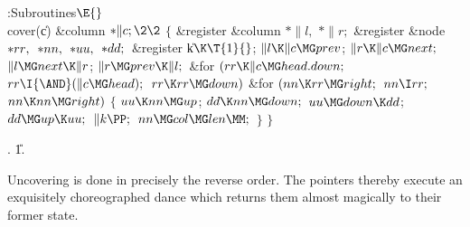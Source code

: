 \Y\B\4:Subroutines\X${}\E{}$\6
\\{cover}(\|c)\1\1\6
\&{column} ${}{*}\|c;\2\2{}$\6
${}\{{}$\5
\1\&{register} \&{column} ${}{*}\|l,{}$ ${}{*}\|r;{}$\6
\&{register} \&{node} ${}{*}\\{rr},{}$ ${}{*}\\{nn},{}$ ${}{*}\\{uu},{}$ ${}{*}%
\\{dd};{}$\6
\&{register} \|k${}\K\T{1}{}$;\7
${}\|l\K\|c\MG\\{prev}{}$;\5
${}\|r\K\|c\MG\\{next};{}$\6
${}\|l\MG\\{next}\K\|r{}$;\5
${}\|r\MG\\{prev}\K\|l;{}$\6
\&{for} ${}(\\{rr}\K\|c\MG\\{head}.\\{down};{}$ ${}\\{rr}\I{\AND}(\|c\MG%
\\{head});{}$ ${}\\{rr}\K\\{rr}\MG\\{down}){}$\1\6
\&{for} ${}(\\{nn}\K\\{rr}\MG\\{right};{}$ ${}\\{nn}\I\\{rr};{}$ ${}\\{nn}\K%
\\{nn}\MG\\{right}){}$\5
${}\{{}$\1\6
${}\\{uu}\K\\{nn}\MG\\{up}{}$;\5
${}\\{dd}\K\\{nn}\MG\\{down};{}$\6
${}\\{uu}\MG\\{down}\K\\{dd}{}$;\5
${}\\{dd}\MG\\{up}\K\\{uu};{}$\6
${}\|k\PP;{}$\6
${}\\{nn}\MG\\{col}\MG\\{len}\MM;{}$\6
\4${}\}{}$\2\2\6
\4${}\}{}$\2\par
{}.
\U1.\fi

Uncovering is done in precisely the reverse order. The pointers thereby
execute an exquisitely choreo\-graphed dance which returns them almost
magically to their former state.

